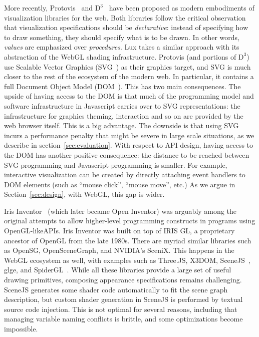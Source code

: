 More recently, Protovis~\cite{Bostock:2009:PAG} and $\textrm{D}^3$~\cite{Bostock:2011:DDD} have been proposed as modern embodiments of visualization libraries for the web. 
Both libraries follow the critical observation that visualization specifications should be \emph{declarative}: instead of specifying how to draw something, they should specify what is to be drawn. 
In other words, \emph{values} are emphasized over \emph{procedures}.
Lux takes a similar approach with its abstraction of the WebGL shading infrastructure.
Protovis (and portions of $\textrm{D}^3$) use Scalable Vector Graphics (SVG~\cite{svg-spec}) as their graphics target, and SVG is much closer to the rest of the ecosystem of the modern web.
In particular, it contains a full Document Object Model (DOM~\cite{dom-spec}). This has two main consequences.
The upside of having access to the DOM is that much of the programming model and software infrastructure in Javascript carries over to SVG representations: the infrastructure for graphics theming, interaction and so on are provided by the web browser itself. This is a big advantage.
The downside is that using SVG incurs a performance penalty that might be severe in large scale situations, as we describe in section~\ref{sec:evaluation}.
With respect to API design, having access to the DOM has another positive consequence: the distance to be reached between SVG programming and Javascript programming is smaller. For example, interactive visualization can be created by directly attaching event handlers to DOM elements (such as ``mouse click'', ``mouse move'', etc.)
As we argue in Section~\ref{sec:design}, with WebGL, this gap is wider.

Iris Inventor~\cite{Strauss:1993:IIA} (which later became Open Inventor) was arguably among the original attempts to allow higher-level programming constructs in programs using OpenGL-likeAPIs.
Iris Inventor was built on top of IRIS GL, a proprietary ancestor of OpenGL from the late 1980s.
There are myriad similar libraries such as OpenSG, OpenSceneGraph, and NVIDIA's SceniX.
This happens in the WebGL ecosystem as well, with examples such as Three.JS, X3DOM, SceneJS~\cite{SceneJS}, glge, and SpiderGL~\cite{DiBenedetto:2010:SAJ}.
While all these libraries provide a large set of useful drawing primitives, composing appearance specifications remains challenging.
SceneJS generates some shader code automatically to fit the scene graph description, but custom shader generation in SceneJS is performed by textual source code injection.
This is not optimal for several reasons, including that managing variable naming conflicts is brittle, and some optimizations become impossible.


